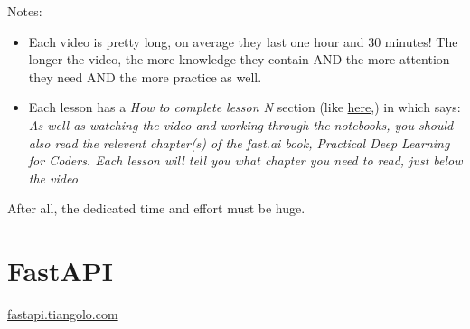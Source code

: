 		
		
		\noindent Notes:
		\begin{itemize}
			\item Each video is pretty long, on average they last one hour and 30 minutes! The longer the video, the more knowledge they contain AND the more attention they need AND the more practice as well.
			
			\item Each lesson has a \textit{How to complete lesson N} section (like \href{https://course.fast.ai/Lessons/lesson1.html#how-to-complete-lesson-1}{here},) in which says: \textit{As well as watching the video and working through the notebooks, you should also read the relevent chapter(s) of the fast.ai book, Practical Deep Learning for Coders. Each lesson will tell you what chapter you need to read, just below the video}
		\end{itemize}
		
		After all, \textsf{the dedicated time and effort must be huge.}
		
		\clearpage
		\section{FastAPI}
		\epigraph{
			\begin{sansserif}
			\end{sansserif}	
		}{\href{https://fastapi.tiangolo.com}{fastapi.tiangolo.com}}
		
		\begin{inparadesc}
			\item \easy
			\item \shortvideo
			\item \many
		\end{inparadesc}
		\vspace{3mm}
		
		
